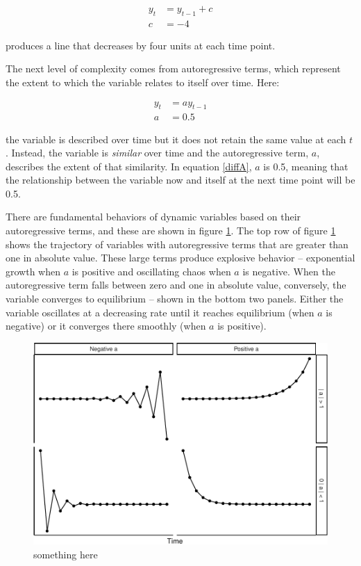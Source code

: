 \documentclass[english,,man]{apa6}
\theoremstyle{definition}
\theoremstyle{definition}
\theoremstyle{definition}
\theoremstyle{remark}
\begin{document}
\begin{equation}
\begin{split}
\label{diffC}
y_{t} &= y_{t-1} + c \\ 
c &= -4
\end{split}
\end{equation}

\noindent produces a line that decreases by four units at each time
point.

The next level of complexity comes from autoregressive terms, which
represent the extent to which the variable relates to itself over time.
Here:

\begin{equation}
\begin{split}
\label{diffA}
y_{t} &= a y_{t-1} \\ 
a &= 0.5
\end{split}
\end{equation}

\noindent the variable is described over time but it does not retain the
same value at each \(t\). Instead, the variable is \emph{similar} over
time and the autoregressive term, \(a\), describes the extent of that
similarity. In equation \ref{diffA}, \(a\) is 0.5, meaning that the
relationship between the variable now and itself at the next time point
will be 0.5.

There are fundamental behaviors of dynamic variables based on their
autoregressive terms, and these are shown in figure \ref{dynamics_plot}.
The top row of figure \ref{dynamics_plot} shows the trajectory of
variables with autoregressive terms that are greater than one in
absolute value. These large terms produce explosive behavior --
exponential growth when \(a\) is positive and oscillating chaos when
\(a\) is negative. When the autoregressive term falls between zero and
one in absolute value, conversely, the variable converges to equilibrium
-- shown in the bottom two panels. Either the variable oscillates at a
decreasing rate until it reaches equilibrium (when \(a\) is negative) or
it converges there smoothly (when \(a\) is positive).

\begin{figure}
\centering
\includegraphics{figs/unnamed-chunk-7-1.pdf}
\caption{\label{fig:unnamed-chunk-7}something here\label{dynamics_plot}}
\end{figure}
\end{document}
